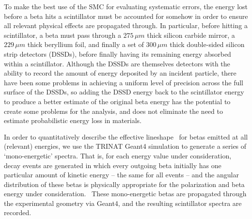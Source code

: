 To make the best use of the SMC for evaluating systematic errors, the energy lost before a beta hits a scintillator must be accounted for somehow in order to ensure all relevant physical effects are propagated through.  In particular, before hitting a scintillator, a beta must pass through a $275\,\mu m$ thick silicon carbide mirror, a $229\,\mu m$ thick beryllium foil, %
and finally a set of $300\,\mu m$ thick double-sided silicon strip detectors (DSSDs), before finally having its remaining energy absorbed within a scintillator.  Although the DSSDs are themselves detectors with the ability to record the amount of energy deposited by an incident particle, there have been some problems in achieving a uniform level of precision across the full surface of the DSSDs, so adding the DSSD energy back to the scintillator energy to produce a better estimate of the original beta energy has the potential to create some problems for the analysis, and does not eliminate the need to estimate probabilistic energy loss in materials.  

In order to quantitatively describe the effective lineshape~ for betas emitted at all (relevant) energies, we use the TRINAT Geant4 simulation to generate a series of `mono-energetic' spectra.  That is, for each energy value under consideration, decay events are generated in which every outgoing beta initially has one particular amount of kinetic energy -- the same for all events -- and the angular distribution of these betas is physically appropriate for the polarization and beta energy under consideration.~  These mono-energetic betas are propagated through the experimental geometry via Geant4, and the resulting scintillator spectra are recorded.  


